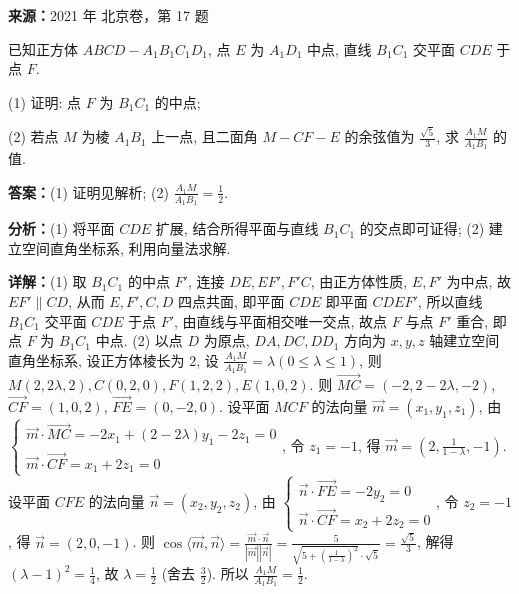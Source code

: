 \begin{question}[points=14]
\textbf{来源：}2021 年 北京卷，第 17 题\par
已知正方体 $ABCD-A_1B_1C_1D_1$, 点 $E$ 为 $A_1D_1$ 中点, 直线 $B_1C_1$ 交平面 $CDE$ 于点 $F$.

(1) 证明: 点 $F$ 为 $B_1C_1$ 的中点;

(2) 若点 $M$ 为棱 $A_1B_1$ 上一点, 且二面角 $M-CF-E$ 的余弦值为 $\frac{\sqrt{5}}{3}$, 求 $\frac{A_1M}{A_1B_1}$ 的值.
\begin{solution}
\textbf{答案：}(1) 证明见解析; (2) $\frac{A_1M}{A_1B_1}=\frac{1}{2}$.

\textbf{分析：}(1) 将平面 $CDE$ 扩展, 结合所得平面与直线 $B_1C_1$ 的交点即可证得; (2) 建立空间直角坐标系, 利用向量法求解.

\textbf{详解：}(1) 取 $B_1C_1$ 的中点 $F'$, 连接 $DE, EF', F'C$, 由正方体性质, $E,F'$ 为中点, 故 $EF'\parallel CD$, 从而 $E,F',C,D$ 四点共面, 即平面 $CDE$ 即平面 $CDEF'$, 所以直线 $B_1C_1$ 交平面 $CDE$ 于点 $F'$, 由直线与平面相交唯一交点, 故点 $F$ 与点 $F'$ 重合, 即点 $F$ 为 $B_1C_1$ 中点.
(2) 以点 $D$ 为原点, $DA, DC, DD_1$ 方向为 $x,y,z$ 轴建立空间直角坐标系, 设正方体棱长为 $2$, 设 $\frac{A_1M}{A_1B_1}=\lambda(0\leq\lambda\leq1)$, 则 $M(2,2\lambda,2), C(0,2,0), F(1,2,2), E(1,0,2)$. 则 $\overrightarrow{MC}=(-2,2-2\lambda,-2)$, $\overrightarrow{CF}=(1,0,2)$, $\overrightarrow{FE}=(0,-2,0)$. 设平面 $MCF$ 的法向量 $\vec{m}=(x_1,y_1,z_1)$, 由 $\begin{cases} \vec{m}\cdot\overrightarrow{MC}=-2x_1+(2-2\lambda)y_1-2z_1=0 \\ \vec{m}\cdot\overrightarrow{CF}=x_1+2z_1=0 \end{cases}$, 令 $z_1=-1$, 得 $\vec{m}=(2,\frac{1}{1-\lambda},-1)$. 设平面 $CFE$ 的法向量 $\vec{n}=(x_2,y_2,z_2)$, 由 $\begin{cases} \vec{n}\cdot\overrightarrow{FE}=-2y_2=0 \\ \vec{n}\cdot\overrightarrow{CF}=x_2+2z_2=0 \end{cases}$, 令 $z_2=-1$, 得 $\vec{n}=(2,0,-1)$. 则 $\cos\langle\vec{m},\vec{n}\rangle=\frac{\vec{m}\cdot\vec{n}}{|\vec{m}||\vec{n}|}=\frac{5}{\sqrt{5+(\frac{1}{1-\lambda})^2}\cdot\sqrt{5}}=\frac{\sqrt{5}}{3}$, 解得 $(\lambda-1)^2=\frac{1}{4}$, 故 $\lambda=\frac{1}{2}$ (舍去 $\frac{3}{2}$). 所以 $\frac{A_1M}{A_1B_1}=\frac{1}{2}$.
\end{solution}
\end{question}

